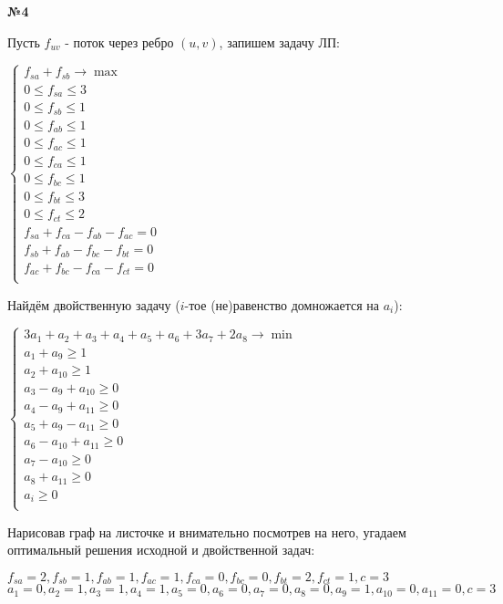\documentclass{article}
\newenvironment{task}{\begin{center}\fontsize{14}{14}\selectfont\bf}{\rm\fontsize{12}{12}\selectfont\end{center}}
\begin{document}
	\begin{task} 
		№4
	\end{task}
	Пусть $f_{uv}$ - поток через ребро $(u, v)$, запишем задачу ЛП:
	\begin{center}
			$\begin{cases}
			f_{sa} + f_{sb} \rightarrow \max \\
			0 \leq f_{sa} \leq 3 \\
			0 \leq f_{sb} \leq 1 \\
			0 \leq f_{ab} \leq 1 \\
			0 \leq f_{ac} \leq 1 \\
			
			0 \leq f_{ca} \leq 1 \\
			0 \leq f_{bc} \leq 1 \\
			0 \leq f_{bt} \leq 3 \\
			0 \leq f_{ct} \leq 2 \\
			
			f_{sa} + f_{ca} - f_{ab} - f_{ac} = 0 \\
			f_{sb} + f_{ab} - f_{bc} - f_{bt} = 0 \\
			f_{ac} + f_{bc} - f_{ca} - f_{ct} = 0 \\
			\end{cases}$
	\end{center}
	Найдём двойственную задачу ($i$-тое (не)равенство домножается на $a_i$):
	\begin{center}
		$\begin{cases}
		3a_1 + a_2 + a_3 + a_4 + a_5 + a_6 + 3a_7 + 2a_8 \rightarrow \min \\
		a_1 + a_9 \geq 1\\
		a_2 + a_{10} \geq 1 \\
		a_3 - a_9 + a_{10} \geq 0 \\
		a_4 - a_9 + a_{11} \geq 0 \\
		a_5 + a_9 - a_{11} \geq 0 \\
		a_6 - a_{10} + a_{11} \geq 0 \\
		a_7 - a_{10} \geq 0 \\
		a_8 + a_{11} \geq 0 \\
		a_i \geq 0 \\
		\end{cases}$
	\end{center}
	Нарисовав граф на листочке и внимательно посмотрев на него, угадаем оптимальный решения исходной и двойственной задач:
	\begin{center}
		$f_{sa} = 2, f_{sb} = 1, f_{ab} = 1, f_{ac} = 1, f_{ca} = 0, f_{bc} = 0, f_{bt} = 2, f_{ct} = 1, c = 3$ \\
		$a_1 = 0, a_2 = 1, a_3 = 1, a_4 = 1, a_5 = 0, a_6 = 0, a_7 = 0, a_8 = 0, a_9 = 1, a_{10} = 0, a_{11} = 0, c = 3$ \\
	\end{center}
\end{document}
